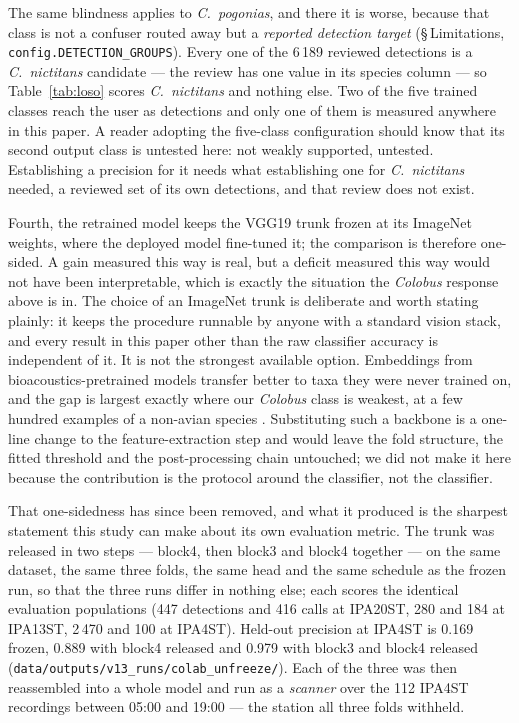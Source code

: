 \documentclass[review,3p,times]{elsarticle}
\begin{document}
The same blindness applies to \textit{C.\ pogonias}, and there it is worse,
because that class is not a confuser routed away but a \emph{reported detection
target} (\S\,Limitations, \texttt{config.DETECTION\_GROUPS}). Every one of the
6\,189 reviewed detections is a \textit{C.\ nictitans} candidate --- the review
has one value in its species column --- so Table~\ref{tab:loso} scores
\textit{C.\ nictitans} and nothing else. Two of the five trained classes reach
the user as detections and only one of them is measured anywhere in this paper.
A reader adopting the five-class configuration should know that its second
output class is untested here: not weakly supported, untested. Establishing a
precision for it needs what establishing one for \textit{C.\ nictitans} needed,
a reviewed set of its own detections, and that review does not exist.

Fourth, the retrained model keeps the VGG19 trunk frozen at its ImageNet
weights, where the deployed model fine-tuned it; the comparison is therefore
one-sided. A gain measured this way is real, but a deficit measured this way
would not have been interpretable, which is exactly the situation the
\textit{Colobus} response above is in. The choice of an ImageNet trunk is
deliberate and worth stating plainly: it keeps the procedure runnable by anyone
with a standard vision stack, and every result in this paper other than the raw
classifier accuracy is independent of it. It is not the strongest available
option. Embeddings from bioacoustics-pretrained models transfer better to taxa
they were never trained on, and the gap is largest exactly where our
\textit{Colobus} class is weakest, at a few hundred examples of a non-avian
species \cite{ghani2023}. Substituting such a backbone is a one-line change to
the feature-extraction step and would leave the fold structure, the fitted
threshold and the post-processing chain untouched; we did not make it here
because the contribution is the protocol around the classifier, not the
classifier.

That one-sidedness has since been removed, and what it produced is the sharpest
statement this study can make about its own evaluation metric. The trunk was
released in two steps --- block4, then block3 and block4 together --- on the same
dataset, the same three folds, the same head and the same schedule as the frozen
run, so that the three runs differ in nothing else; each scores the identical
evaluation populations (447 detections and 416 calls at IPA20ST, 280 and 184 at
IPA13ST, 2\,470 and 100 at IPA4ST). Held-out precision at IPA4ST is 0.169 frozen,
0.889 with block4 released and 0.979 with block3 and block4 released
(\texttt{data/outputs/v13\_runs/colab\_unfreeze/}). Each of the three was then
reassembled into a whole model and run as a \emph{scanner} over the 112 IPA4ST
recordings between 05:00 and 19:00 --- the station all three folds withheld.
\end{document}
